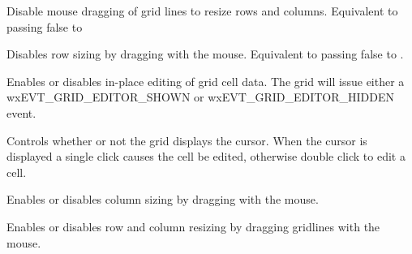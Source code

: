 \label{wxgriddisabledraggridsize}


Disable mouse dragging of grid lines to resize rows and columns. Equivalent to passing
false to 



\label{wxgriddisabledragrowsize}


Disables row sizing by dragging with the mouse. Equivalent to passing false to
.



\label{wxgridenablecelleditcontrol}


Enables or disables in-place editing of grid cell data. The grid will issue either a
wxEVT\_GRID\_EDITOR\_SHOWN or wxEVT\_GRID\_EDITOR\_HIDDEN event.



\label{wxgridenablecursor}


Controls whether or not the grid displays the cursor. When the cursor is displayed a single
click causes the cell be edited, otherwise double click to edit a cell.



\label{wxgridenabledragcolsize}


Enables or disables column sizing by dragging with the mouse.



\label{wxgridenabledraggridsize}


Enables or disables row and column resizing by dragging gridlines with the mouse.



\label{wxgridenabledragrowsize}

